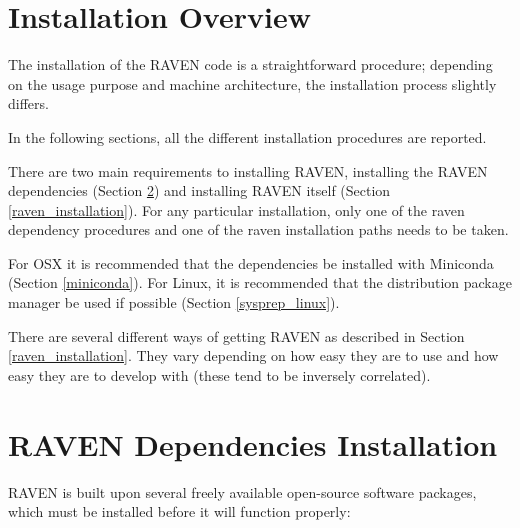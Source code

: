 \section{Installation Overview}

The installation of the RAVEN code is a straightforward procedure;
depending on the usage purpose and machine architecture, the
installation process slightly differs.

In the following sections, all the different installation procedures
are reported.

There are two main requirements to installing RAVEN, installing the
RAVEN dependencies (Section \ref{raven_dependencies}) and installing
RAVEN itself (Section \ref{raven_installation}).  For any particular
installation, only one of the raven dependency procedures and one of
the raven installation paths needs to be taken.

For OSX it is recommended that the dependencies be installed with
Miniconda (Section \ref{miniconda}).  For Linux, it is recommended
that the distribution package manager be used if possible (Section
\ref{sysprep_linux}).

There are several different ways of getting RAVEN as described in
Section \ref{raven_installation}.  They vary depending on how easy
they are to use and how easy they are to develop with (these tend to
be inversely correlated).

\newcommand{\goToRavenInstallation}{Now go on to Section \ref{raven_installation} for Raven installation.
}


\section{RAVEN Dependencies Installation}
\label{raven_dependencies}

RAVEN is built upon several freely available open-source software packages, 
which must  be installed before it will function properly:

